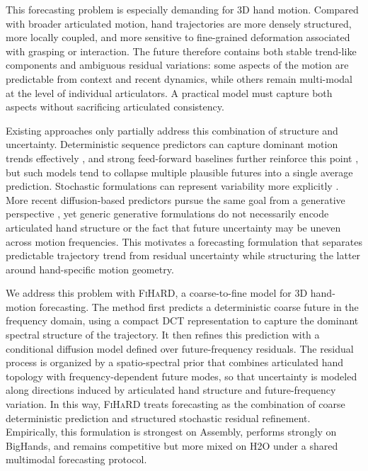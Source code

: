 \documentclass[runningheads]{llncs}
\newcommand{\modelname}{\textsc{FiHaRD}}
\begin{document}
This forecasting problem is especially demanding for 3D hand motion. Compared with broader articulated motion, hand trajectories are more densely structured, more locally coupled, and more sensitive to fine-grained deformation associated with grasping or interaction. The future therefore contains both stable trend-like components and ambiguous residual variations: some aspects of the motion are predictable from context and recent dynamics, while others remain multi-modal at the level of individual articulators. A practical model must capture both aspects without sacrificing articulated consistency.

Existing approaches only partially address this combination of structure and uncertainty. Deterministic sequence predictors can capture dominant motion trends effectively \cite{Martinez2017RNN,Mao2020HistoryRepeats,Dang2021MSRGCN}, and strong feed-forward baselines further reinforce this point \cite{Guo2023SiMLPe}, but such models tend to collapse multiple plausible futures into a single average prediction. Stochastic formulations can represent variability more explicitly \cite{Yuan2020DLow,aliakbarian2020stochastic,Chen2023HumanMAC}. More recent diffusion-based predictors pursue the same goal from a generative perspective \cite{Sun2024CoMusion,Tang2024PromptFDDM}, yet generic generative formulations do not necessarily encode articulated hand structure or the fact that future uncertainty may be uneven across motion frequencies. This motivates a forecasting formulation that separates predictable trajectory trend from residual uncertainty while structuring the latter around hand-specific motion geometry.

We address this problem with \modelname{}, a coarse-to-fine model for 3D hand-motion forecasting. The method first predicts a deterministic coarse future in the frequency domain, using a compact DCT representation to capture the dominant spectral structure of the trajectory. It then refines this prediction with a conditional diffusion model defined over future-frequency residuals. The residual process is organized by a spatio-spectral prior that combines articulated hand topology with frequency-dependent future modes, so that uncertainty is modeled along directions induced by articulated hand structure and future-frequency variation. In this way, \modelname{} treats forecasting as the combination of coarse deterministic prediction and structured stochastic residual refinement. Empirically, this formulation is strongest on Assembly, performs strongly on BigHands, and remains competitive but more mixed on H2O under a shared multimodal forecasting protocol. 
\end{document}
